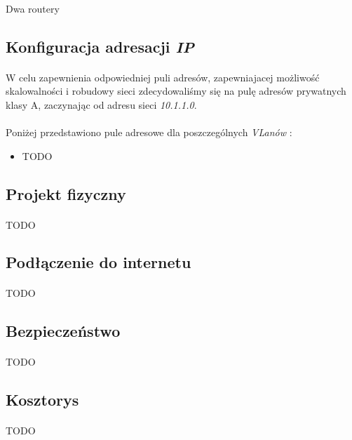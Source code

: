 \paragraph{}
Dwa routery 


\subsection{Konfiguracja adresacji \textit{IP}}
\paragraph{}
W celu zapewnienia odpowiedniej puli adresów, zapewniajacej możliwość skalowalności i robudowy sieci zdecydowaliśmy się na pulę adresów prywatnych klasy A, zaczynając od adresu sieci \textit{10.1.1.0}.
\paragraph{}
Poniżej przedstawiono pule adresowe dla poszczególnych \textit{VLanów} :
\begin{itemize}
	\item TODO
\end{itemize}


\subsection{Projekt fizyczny}
\paragraph{}
TODO

\subsection{Podłączenie do internetu}
\paragraph{}
TODO

\subsection{Bezpieczeństwo}
\paragraph{}
TODO

\subsection{Kosztorys}
\paragraph{}
TODO